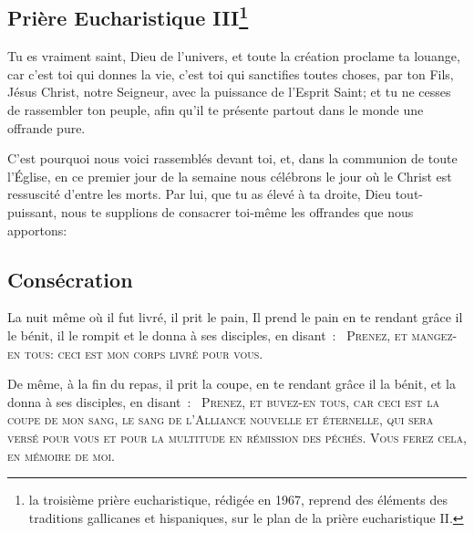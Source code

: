 \subsection{Prière Eucharistique III\footnote{la troisième prière eucharistique, rédigée en 1967, reprend des 
éléments des traditions gallicanes et hispaniques, sur le plan de la 
prière eucharistique II.}}\label{pe3}

Tu es vraiment saint, Dieu de l'univers,
et toute la création proclame ta louange,
car c'est toi qui donnes la vie,
c'est toi qui sanctifies toutes choses,
par ton Fils, Jésus Christ, notre Seigneur,
avec la puissance de l'Esprit Saint;
et tu ne cesses de rassembler ton peuple,
afin qu'il te présente
partout dans le monde
une offrande pure.


C'est pourquoi nous voici rassemblés devant toi,
et, dans la communion de toute l'Église,
en ce premier jour de la semaine
nous célébrons le jour
où le Christ est ressuscité d'entre les morts.
Par lui, que tu as élevé à ta droite,
Dieu tout-puissant, nous te supplions
de consacrer toi-même
les offrandes que nous apportons:

\subsection{Consécration}

La nuit même où il fut livré, il prit le pain, Il prend le pain
en te rendant grâce il le bénit, il le rompit
et le donna à ses disciples, en disant~: 
\textsc{\og~Prenez, et mangez-en tous:} 
\textsc{ceci est mon corps livré pour vous.~\fg}



De même, à la fin du repas,
il prit la coupe, 
en te rendant grâce il la bénit,
et la donna à ses disciples, en disant~:
\textsc{\og~Prenez, et buvez-en tous,} 
\textsc{car ceci est la coupe de mon sang,
le sang de l'Alliance nouvelle et éternelle,
qui sera versé
pour vous et pour la multitude
en rémission des péchés.
Vous ferez cela, en mémoire de moi.~\fg}


